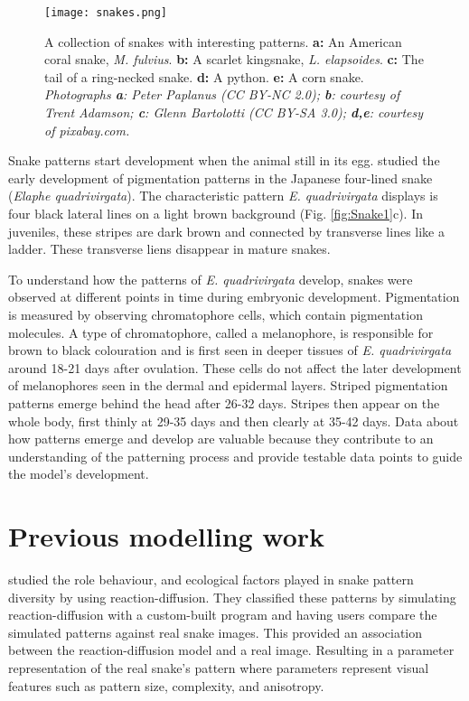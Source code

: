\begin{figure}[hb]
	\centering
	\texttt{[image: snakes.png]}
	\caption{A collection of snakes with interesting patterns. \textbf{a:} An American coral snake, \textit{M. fulvius}. \textbf{b:} A scarlet kingsnake, \textit{L. elapsoides}. \textbf{c:} The tail of a ring-necked snake. \textbf{d:} A python. \textbf{e:} A corn snake. \textit{Photographs \textbf{a}: Peter Paplanus (CC BY-NC 2.0); \textbf{b}: courtesy of Trent Adamson; \textbf{c}: Glenn Bartolotti (CC BY-SA 3.0); \textbf{d,e}: courtesy of pixabay.com.}}
	\label{fig:realSnakePatterns}
\end{figure}

Snake patterns start development when the animal still in its egg. \citet{murakami2018} studied the early development of pigmentation patterns in the Japanese four-lined snake (\textit{Elaphe quadrivirgata}). The characteristic pattern \textit{E. quadrivirgata} displays is four black lateral lines on a light brown background (Fig. \ref{fig:Snake1}c). In juveniles, these stripes are dark brown and connected by transverse lines like a ladder. These transverse liens disappear in mature snakes.
 
To understand how the patterns of \textit{E. quadrivirgata} develop, snakes were observed at different points in time during embryonic development. Pigmentation is measured by observing chromatophore cells, which contain pigmentation molecules. A type of chromatophore, called a melanophore, is responsible for brown to black colouration and is first seen in deeper tissues of \textit{E. quadrivirgata} around 18-21 days after ovulation. These cells do not affect the later development of melanophores seen in the dermal and epidermal layers. Striped pigmentation patterns emerge behind the head after 26-32 days. Stripes then appear on the whole body, first thinly at 29-35 days and then clearly at 35-42 days. Data about how patterns emerge and develop are valuable because they contribute to an understanding of the patterning process and provide testable data points to guide the model's development.

\section{Previous modelling work}
\citet{allen2013} studied the role behaviour, and ecological factors played in snake pattern diversity by using reaction-diffusion. They classified these patterns by simulating reaction-diffusion with a custom-built program and having users compare the simulated patterns against real snake images. This provided an association between the reaction-diffusion model and a real image. Resulting in a parameter representation of the real snake's pattern where parameters represent visual features such as pattern size, complexity, and anisotropy.

